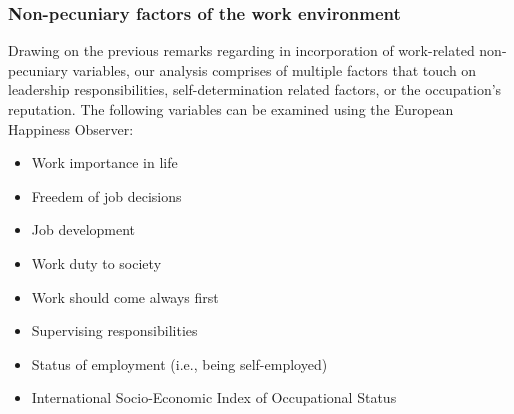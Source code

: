 \documentclass[preprint,12pt,authoryear]{elsarticle}
\begin{document}
\subsubsection{Non-pecuniary factors of the work environment}
Drawing on the previous remarks regarding in incorporation of work-related non-pecuniary variables, our analysis comprises of
multiple factors that touch on leadership responsibilities, self-determination related factors, or the occupation's reputation.
The following variables can be examined using the European Happiness Observer:
\begin{itemize}
   \item Work importance in life
   \item Freedem of job decisions
   \item Job development
   \item Work duty to society
   \item Work should come always first
   \item Supervising responsibilities 
   \item Status of employment (i.e., being self-employed)
   \item International Socio-Economic Index of Occupational Status   
\end{itemize}
	
\end{document}
